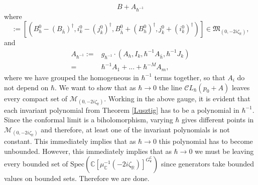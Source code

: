 \documentclass[12pt,oneside,reqno]{amsart}
\theoremstyle{definition}
\numberwithin{equation}{section}
\numberwithin{theorem}{section}
\newcommand{\R}{\mathbb{R}}
\newcommand{\C}{\mathbb{C}}
\begin{document}
\begin{equation*}
B +A_{\hbar^{-1}}
\end{equation*}
%
where 
%
\begin{equation*}
[B]:= [(B_h^0 - (B_{\bar h})^{\dagger}, i_k^0 - (j_k^0)^{\dagger}, B_{\bar h}^0 + (B_h^0)^{\dagger}, j_k^0+(i_k^0)^{\dagger})] \in \mathfrak M_{(0,-2i\zeta_{\R})},
\end{equation*}
%
and 
%
\begin{equation}\label{HBE}
\begin{split}
A_{\hbar^{-1}} :=& g_{\hbar^{-1}}\cdot (A_h, I_k, \hbar^{-1}A_{\bar h},\hbar^{-1}J_k)\\
=& \hbar^{-1}A_1+...+\hbar^{-M}A_m,
\end{split}
\end{equation}
where we have grouped the homogeneous in $\hbar^{-1}$ terms together, so that $A_i$ do not depend on $\hbar$. We want to show that as $\hbar\to 0$ the line $\mathcal CL_{\hbar}(p_0+A)$ leaves every compact set of $\mathcal M_{(0,-2i\zeta_{\R})}$. Working in the above gauge, it is evident that each invariant polynomial from Theorem \ref{Lusztig} has to be a polynomial in $\hbar^{-1}$. Since the conformal limit is a biholomorphism, varying $\hbar$ gives different points in $\mathcal M_{(0,-2i\zeta_{\R})}$ and therefore, at least one of the invariant polynomials is not constant. This immediately implies that as $\hbar\to 0$ this polynomial has to become unbounded. However, this immediately implies that as $\hbar \to 0$ we must be leaving every bounded set of $\mathrm{Spec}(\C[\mu_{\C}^{-1}(-2i\zeta_{\R})]^{G_{\mathbf{v}}^{\C}})$ since generators take bounded values on bounded sets. Therefore we are done. 
%







\end{document}
